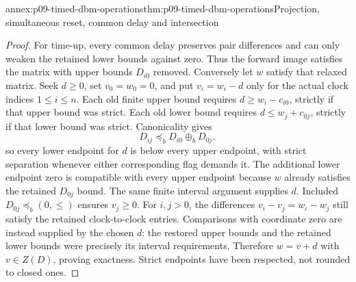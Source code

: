 \begin{annexitem}{annex:p09-timed-dbm-operations}{thm:p09-timed-dbm-operations}{Projection, simultaneous reset, common delay and intersection}
\begin{proof}
For time-up, every common delay preserves pair differences and can only
weaken the retained lower bounds against zero. Thus the forward image
satisfies the matrix with upper bounds \(D_{i0}\) removed. Conversely
let \(w\) satisfy that relaxed matrix. Seek \(d\geq0\), set
\(v_0=w_0=0\), and put \(v_i=w_i-d\) only for the actual clock
indices \(1\leq i\leq n\). Each old finite upper bound requires
\(d\geq w_i-c_{i0}\), strictly if that upper bound was strict. Each
old lower bound requires \(d\leq w_j+c_{0j}\), strictly if that
lower bound was strict. Canonicality gives
\[
 D_{ij}\preceq_bD_{i0}\oplus_bD_{0j},
\]
so every lower endpoint for \(d\) is below every upper endpoint, with
strict separation whenever either corresponding flag demands it. The
additional lower endpoint zero is compatible with every upper endpoint
because \(w\) already satisfies the retained \(D_{0j}\) bound.
The same finite interval argument supplies \(d\). Included
\(D_{0j}\preceq_b(0,\leq)\) ensures \(v_j\geq0\). For
\(i,j>0\), the differences \(v_i-v_j=w_i-w_j\) still satisfy the
retained clock-to-clock entries. Comparisons with coordinate zero are
instead supplied by the chosen \(d\): the restored upper bounds and
the retained lower bounds were precisely its interval requirements.
Therefore \(w=v+d\) with \(v\in Z(D)\), proving exactness. Strict
endpoints have been respected, not rounded to closed ones.
\end{proof}
\end{annexitem}

